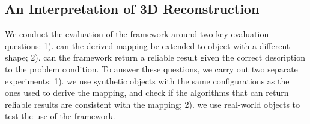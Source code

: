 \subsection{An Interpretation of 3D Reconstruction}
We conduct the evaluation of the framework around two key evaluation questions: 1). can the derived mapping be extended to object with a different shape; 2). can the framework return a reliable result given the correct description to the problem condition. To answer these questions, we carry out two separate experiments: 1). we use synthetic objects with the same configurations as the ones used to derive the mapping, and check if the algorithms that can return reliable results are consistent with the mapping; 2). we use real-world objects to test the use of the framework.



